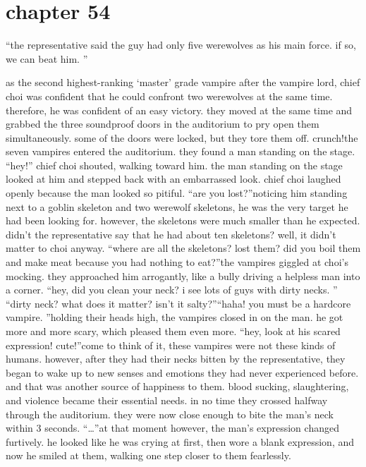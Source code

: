 \section{chapter 54}

                            “the representative said the guy had only five werewolves as his main force.
 if so, we can beat him.
”




as the second highest-ranking ‘master’ grade vampire after the vampire lord, chief choi was confident that he could confront two werewolves at the same time.
 therefore, he was confident of an easy victory.
they moved at the same time and grabbed the three soundproof doors in the auditorium to pry open them simultaneously.
 some of the doors were locked, but they tore them off.
crunch!the seven vampires entered the auditorium.
 they found a man standing on the stage.
“hey!” chief choi shouted, walking toward him.
 the man standing on the stage looked at him and stepped back with an embarrassed look.
chief choi laughed openly because the man looked so pitiful.
“are you lost?”noticing him standing next to a goblin skeleton and two werewolf skeletons, he was the very target he had been looking for.
 however, the skeletons were much smaller than he expected.
 didn’t the representative say that he had about ten skeletons? well, it didn’t matter to choi anyway.
“where are all the skeletons? lost them? did you boil them and make meat because you had nothing to eat?”the vampires giggled at choi’s mocking.
 they approached him arrogantly, like a bully driving a helpless man into a corner.
“hey, did you clean your neck? i see lots of guys with dirty necks.
”
“dirty neck? what does it matter? isn’t it salty?”“haha! you must be a hardcore vampire.
”holding their heads high, the vampires closed in on the man.
 he got more and more scary, which pleased them even more.
“hey, look at his scared expression! cute!”come to think of it, these vampires were not these kinds of humans.
 however, after they had their necks bitten by the representative, they began to wake up to new senses and emotions they had never experienced before.
 and that was another source of happiness to them.
 blood sucking, slaughtering, and violence became their essential needs.
in no time they crossed halfway through the auditorium.
 they were now close enough to bite the man’s neck within 3 seconds.
“…”at that moment however, the man’s expression changed furtively.
 he looked like he was crying at first, then wore a blank expression, and now he smiled at them, walking one step closer to them fearlessly.
